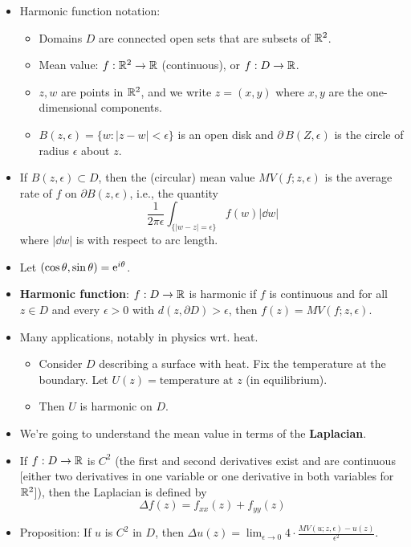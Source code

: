 \documentclass[../apprentice.tex]{subfiles}
\begin{document}
\begin{itemize}
    \item Harmonic function notation:
    \begin{itemize}
        \item Domains $D$ are connected open sets that are subsets of $\R^2$.
        \item Mean value: $f:\R^2\to\R$ (continuous), or $f:D\to\R$.
        \item $z,w$ are points in $\R^2$, and we write $z=(x,y)$ where $x,y$ are the one-dimensional components.
        \item $B(z,\epsilon)=\{w:|z-w|<\epsilon\}$ is an open disk and $\partial\, B(Z,\epsilon)$ is the circle of radius $\epsilon$ about $z$.
    \end{itemize}
    \item If $B(z,\epsilon)\subset D$, then the (circular) mean value $MV(f;z,\epsilon)$ is the average rate of $f$ on $\partial B(z,\epsilon)$, i.e., the quantity
    \begin{equation*}
        \frac{1}{2\pi\epsilon}\int_{\{|w-z|=\epsilon\}}f(w)|\dd{w}|
    \end{equation*}
    where $|\dd{w}|$ is with respect to arc length.
    \item Let $(\cos\theta,\sin\theta)=\e[i\theta]$.
    \item \textbf{Harmonic function}: $f:D\to\R$ is harmonic if $f$ is continuous and for all $z\in D$ and every $\epsilon>0$ with $d(z,\partial D)>\epsilon$, then $f(z)=MV(f;z,\epsilon)$.
    \item Many applications, notably in physics wrt. heat.
    \begin{itemize}
        \item Consider $D$ describing a surface with heat. Fix the temperature at the boundary. Let $U(z)=\text{temperature at }z$ (in equilibrium).
        \item Then $U$ is harmonic on $D$.
    \end{itemize}
    \item We're going to understand the mean value in terms of the \textbf{Laplacian}.
    \item If $f:D\to\R$ is $C^2$ (the first and second derivatives exist and are continuous [either two derivatives in one variable or one derivative in both variables for $\R^2$]), then the Laplacian is defined by
    \begin{equation*}
        \Delta f(z) = f_{xx}(z)+f_{yy}(z)
    \end{equation*}
    \item Proposition: If $u$ is $C^2$ in $D$, then $\Delta u(z)=\lim_{\epsilon\to 0}4\cdot\frac{MV(u;z,\epsilon)-u(z)}{\epsilon^2}$.

\end{itemize}
\end{document}
